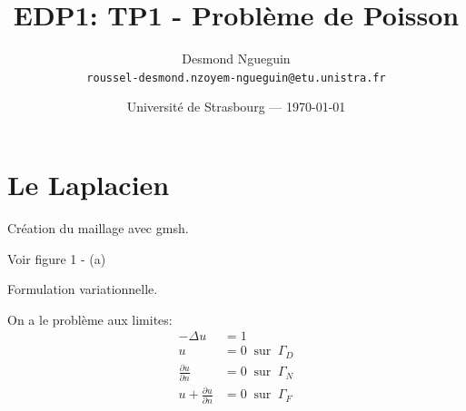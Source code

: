 \documentclass{article}
\title{EDP1: TP1 - Problème de Poisson} %
\author{Desmond Ngueguin\\ \texttt{roussel-desmond.nzoyem-ngueguin@etu.unistra.fr}} %
\date{Université de Strasbourg --- \today} %
\begin{document}
\maketitle %






\section{Le Laplacien}

\begin{question}
	Création du maillage avec gmsh.
\end{question}

Voir figure 1 - (a)


\begin{question}
	Formulation variationnelle.
\end{question}

On a le problème aux limites:
\begin{equation}
	\label{eq:3}
	\begin{split}
	  -\Delta u &= 1\\
	  u &= 0\ \mbox{ sur }\ \Gamma_D\\
	  \frac{\partial u}{\partial n} &= 0\ \mbox{ sur }\ \Gamma_N\\
	  u + \frac{\partial u}{\partial n} &= 0\ \mbox{ sur }\ \Gamma_F\\
	\end{split}
\end{equation}
\end{document}
